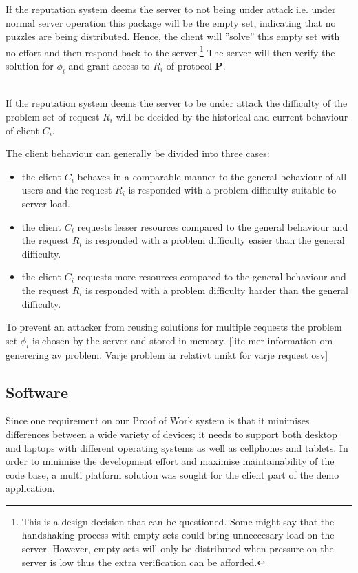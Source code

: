  \noindent If the reputation system deems the server to not being under attack i.e. under normal server operation this package will be the empty set, indicating that no puzzles are being distributed. Hence, the client will ''solve'' this empty set with no effort and then respond back to the server.\footnote{This is a design decision that can be questioned. Some might say that the handshaking process with empty sets could bring unneccesary load on the server. However, empty sets will only be distributed when pressure on the server is low thus the extra verification can be afforded.} The server will then verify the solution for $\phi_i$ and grant access to $R_i$ of protocol \textbf{P}.


\\
If the reputation system deems the server to be under attack the difficulty of the problem set of request $R_i$ will be decided by the historical and current behaviour of client $C_i$. 


The client behaviour can generally be divided into three cases:
\begin{itemize}
\item the client $C_i$ behaves in a comparable manner to the general behaviour of all users and the request $R_i$ is responded with a problem difficulty suitable to server load.
\item the client $C_i$ requests lesser resources compared to the general behaviour and the request $R_i$ is responded with a problem difficulty easier than the general difficulty.
\item the client $C_i$ requests more resources compared to the general behaviour and the request $R_i$ is responded with a problem difficulty harder than the general difficulty.
\end{itemize}

To prevent an attacker from reusing solutions for multiple requests the problem set $\phi_i$ is chosen by the server and stored in memory.
[lite mer information om generering av problem. Varje problem är relativt unikt för varje request osv]


\subsection{Software}
Since one requirement on our Proof of Work system is that it minimises differences between a wide variety of devices; it needs to support both desktop and laptops with different operating systems as well as cellphones and tablets.
In order to minimise the development effort and maximise maintainability of the code base, a multi platform solution was sought for the client part of the demo application. 

